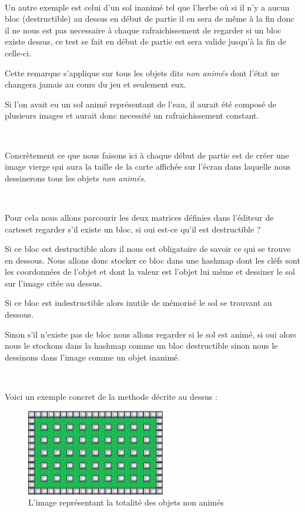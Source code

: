 			$\,$			
			
			Un autre exemple est celui d'un sol inanimé tel que l'herbe où si il n'y a
			aucun bloc (destructible) au dessus en début de partie il en sera de même à
			la fin donc il ne nous est pas necessaire à chaque rafraichissement de
			regarder si un bloc existe dessus, ce test se fait en début de partie est
			sera valide jusqu'à la fin de celle-ci.
			
			
			Cette remarque s'applique sur tous les objets dits \emph{non animés} dont
			l'état ne changera jamais au cours du jeu et seulement eux.
			
			
			Si l'on avait eu un sol animé représentant de l'eau, il aurait été composé de
			plusieurs images et aurait donc necessité un rafraichissement constant.

			$\,$
			
			Concrètement ce que nous faisons ici à chaque début de partie est de créer
			une image vierge qui aura la taille de la carte affichée sur l'écran dans
			laquelle nous dessinerons tous les objets \emph{non animés}.
			
			$\,$
			
			Pour cela nous allons parcourir les deux matrices définies dans l'éditeur de
			cartes\footnotemark[2] et regarder s'il existe un bloc, si oui est-ce
			qu'il est destructible ?
			
			Si ce bloc est destructible alors il nous est obligatoire de savoir ce qui se
			trouve en dessous.
			Nous allons donc stocker ce bloc dans une hashmap dont les cléfs sont les
			coordonnées de l'objet et dont la valeur est l'objet lui même et dessiner le
			sol sur l'image citée au dessus.
			
			Si ce bloc est indestructible alors inutile de mémorisé le sol se trouvant
			au dessous.
			
			Sinon s'il n'existe pas de bloc nous allons regarder si le sol est animé, si
			oui alors nous le stockons dans la hashmap comme un bloc destructible sinon
			nous le dessinons dans l'image comme un objet inanimé.
			
			$\,$
			
			Voici un exemple concret de la methode décrite au dessus :
				

			\begin{figure}[!h]			
				\begin{center}			
					\includegraphics[width=229px, height=142px]{Developpement/Img/map.eps}
					\caption{L'image représentant la totalité des objets non animés}
				\end{center}
			\end{figure}
			
